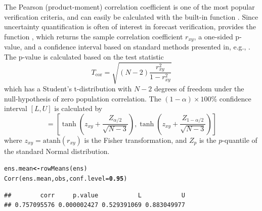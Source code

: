 \documentclass[article]{jss}\usepackage[]{graphicx}\usepackage[]{color}
\makeatletter
\newcommand{\hlnum}[1]{\textcolor[rgb]{0.502,0,0.502}{\textbf{#1}}}%
\newcommand{\hlstd}[1]{\textcolor[rgb]{0,0,0}{#1}}%
\newcommand{\hlkwb}[1]{\textcolor[rgb]{0.502,0.502,0.753}{\textbf{#1}}}%
\newcommand{\hlkwc}[1]{\textcolor[rgb]{0,0.502,0.753}{#1}}%
\newcommand{\hlkwd}[1]{\textcolor[rgb]{0,0.267,0.4}{#1}}%
\newenvironment{kframe}{%
 \def\at@end@of@kframe{}%
 \ifinner\ifhmode%
  \def\at@end@of@kframe{\end{minipage}}%
  \begin{minipage}{\columnwidth}%
 \fi\fi%
 \def\FrameCommand##1{\hskip\@totalleftmargin \hskip-\fboxsep
 \colorbox{shadecolor}{##1}\hskip-\fboxsep
     \hskip-\linewidth \hskip-\@totalleftmargin \hskip\columnwidth}%
 \MakeFramed {\advance\hsize-\width
   \@totalleftmargin\z@ \linewidth\hsize
   \@setminipage}}%
 {\par\unskip\endMakeFramed%
 \at@end@of@kframe}
\newenvironment{knitrout}{}{} %
\newcommand{\atanh}{\text{atanh}}
\makeatother
\begin{document}
The Pearson (product-moment) correlation coefficient is one of the most popular verification criteria, and can easily be calculated with the built-in  function .
Since uncertainty quantification is often of interest in forecast verification,  provides the function , which returns the sample correlation coefficient $r_{xy}$, a one-sided p-value, and a confidence interval based on standard methods presented in, e.g., \citet{vonstorch2001statistical}.
The p-value is calculated based on the test statistic
%
\begin{equation}
T_{\text{cor}} = \sqrt{(N-2) \frac{r_{xy}^2}{1 - r_{xy}^2}}
\end{equation}
%
which has a Student's t-distribution with $N-2$ degrees of freedom under the null-hypothesis of zero population correlation.
The $(1-\alpha)\times 100\%$ confidence interval $[L,U]$ is calculated by
%
\begin{equation}
[L, U] = \left[ \tanh\left(z_{xy} + \frac{Z_{\alpha/2}}{\sqrt{N-3}}\right), \tanh\left(z_{xy} + \frac{Z_{1-\alpha/2}}{\sqrt{N-3}}\right)\right]\label{eq:fisherCi}
\end{equation} 
%
where $z_{xy} = \atanh(r_{xy})$ is the Fisher transformation, and $Z_p$ is the $p$-quantile of the standard Normal distribution.
%
\begin{knitrout}
\color{fgcolor}\begin{kframe}
\begin{alltt}
\hlstd{ens.mean} \hlkwb{<-} \hlkwd{rowMeans}\hlstd{(ens)}
\hlkwd{Corr}\hlstd{(ens.mean, obs,} \hlkwc{conf.level}\hlstd{=}\hlnum{0.95}\hlstd{)}
\end{alltt}
\begin{verbatim}
##        corr     p.value           L           U 
## 0.757095576 0.000002427 0.529391069 0.883049977
\end{verbatim}
\end{kframe}
\end{knitrout}
\end{document}
